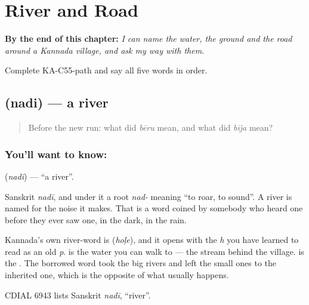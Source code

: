 
\chapter{River and Road}
\label{ch:ka-river-road}

\begin{chapteropening}
\textbf{By the end of this chapter:} \emph{I can name the water, the ground and the road around a Kannada village, and ask my way with them.}

Complete KA-C55-path and say all five words in order.
\end{chapteropening}

\section[\texorpdfstring{\kn{ನದಿ} (nadi)}{ನದಿ (nadi)}]{ (nadi) — a river}

\label{lesson:KA-C55-river}



\begin{quote}
Before the new run: what did \emph{bēru} mean, and what did \emph{bīja} mean?
\end{quote}

\subsection*{You'll want to know: }
\textbf{} (\emph{nadi}) — \textquotedblleft{}a river\textquotedblright{}.

Sanskrit \emph{nadī}, and under it a root \emph{nad-} meaning \textquotedblleft{}to roar, to sound\textquotedblright{}. A river is named for the noise it makes. That is a word coined by somebody who heard one before they ever saw one, in the dark, in the rain.

Kannada's own river-word is  (\emph{hoḷe}), and it opens with the \emph{h} you have learned to read as an old \emph{p}.  is the water you can walk to — the stream behind the village.  is the . The borrowed word took the big rivers and left the small ones to the inherited one, which is the opposite of what usually happens.

CDIAL 6943 lists Sanskrit \emph{nadī}, \textquotedblleft{}river\textquotedblright{}.

